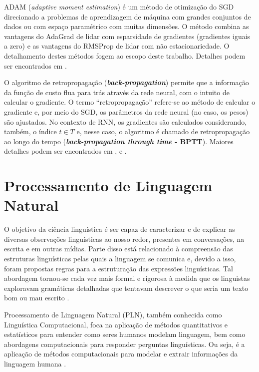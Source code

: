 \documentclass{automatextcc}
\begin{document}
ADAM (\textit{adaptive moment estimation}) é um método de otimização do SGD direcionado a problemas de aprendizagem de máquina com grandes conjuntos de dados ou com espaço paramétrico com muitas dimensões. O método combina as vantagens do AdaGrad \citep{duchi2011} de lidar com esparsidade de gradientes (gradientes iguais a zero) e as vantagens do RMSProp \citep{tieleman2012} de lidar com não estacionariedade. O detalhamento destes métodos fogem ao escopo deste trabalho. Detalhes podem ser encontrados em \citet{kingma2014}.

O algoritmo de retropropagação (\textbf{\textit{back-propagation}}) permite que a informação da função de custo flua para trás através da rede neural, com o intuito de calcular o gradiente. O termo ``retropropagação'' refere-se ao método de calcular o gradiente e, por meio do SGD, os parâmetros da rede neural (no caso, os pesos) são ajustados. No contexto de RNN, os gradientes são calculados considerando, também, o índice $t \in T$ e, nesse caso, o algoritmo é chamado de retropropagação ao longo do tempo (\textbf{\textit{back-propagation through time} - BPTT}). Maiores detalhes podem ser encontrados em \citet{haykin2009}, \citet{goodfellow2016} e \citet{fan2021}.  



\section{Processamento de Linguagem Natural}
O objetivo da ciência linguística é ser capaz de caracterizar e de explicar as diversas observações linguísticas ao nosso redor, presentes em conversações, na escrita e em outras mídias. Parte disso está relacionado à compreensão das estruturas linguísticas pelas quais a linguagem se comunica e, devido a isso, foram propostas regras para a estruturação das expressões linguísticas. Tal abordagem tornou-se cada vez mais formal e rigorosa à medida que os linguistas exploravam gramáticas detalhadas que tentavam descrever o que seria um texto bom ou mau escrito \citep{manning1999}.

Processamento de Linguagem Natural (PLN), também conhecida como Linguística Computacional, foca na aplicação de métodos quantitativos e estatísticos para entender como seres humanos modelam linguagem, bem como abordagens computacionais para responder perguntas linguísticas. Ou seja, é a aplicação de métodos computacionais para modelar e extrair informações da linguagem humana \citep{kamath2019}. 
\end{document}
